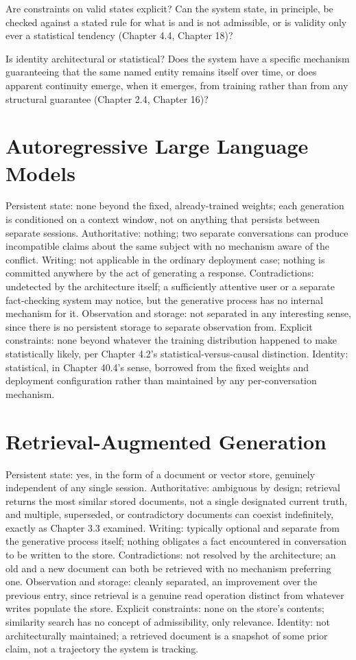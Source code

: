 Are constraints on valid states explicit? Can the system state, in principle, be checked against a stated rule for what is and is not admissible, or is validity only ever a statistical tendency (Chapter 4.4, Chapter 18)?

Is identity architectural or statistical? Does the system have a specific mechanism guaranteeing that the same named entity remains itself over time, or does apparent continuity emerge, when it emerges, from training rather than from any structural guarantee (Chapter 2.4, Chapter 16)?

\section{Autoregressive Large Language Models}

Persistent state: none beyond the fixed, already-trained weights; each generation is conditioned on a context window, not on anything that persists between separate sessions. Authoritative: nothing; two separate conversations can produce incompatible claims about the same subject with no mechanism aware of the conflict. Writing: not applicable in the ordinary deployment case; nothing is committed anywhere by the act of generating a response. Contradictions: undetected by the architecture itself; a sufficiently attentive user or a separate fact-checking system may notice, but the generative process has no internal mechanism for it. Observation and storage: not separated in any interesting sense, since there is no persistent storage to separate observation from. Explicit constraints: none beyond whatever the training distribution happened to make statistically likely, per Chapter 4.2's statistical-versus-causal distinction. Identity: statistical, in Chapter 40.4's sense, borrowed from the fixed weights and deployment configuration rather than maintained by any per-conversation mechanism.

\section{Retrieval-Augmented Generation}

Persistent state: yes, in the form of a document or vector store, genuinely independent of any single session. Authoritative: ambiguous by design; retrieval returns the most similar stored documents, not a single designated current truth, and multiple, superseded, or contradictory documents can coexist indefinitely, exactly as Chapter 3.3 examined. Writing: typically optional and separate from the generative process itself; nothing obligates a fact encountered in conversation to be written to the store. Contradictions: not resolved by the architecture; an old and a new document can both be retrieved with no mechanism preferring one. Observation and storage: cleanly separated, an improvement over the previous entry, since retrieval is a genuine read operation distinct from whatever writes populate the store. Explicit constraints: none on the store's contents; similarity search has no concept of admissibility, only relevance. Identity: not architecturally maintained; a retrieved document is a snapshot of some prior claim, not a trajectory the system is tracking.

